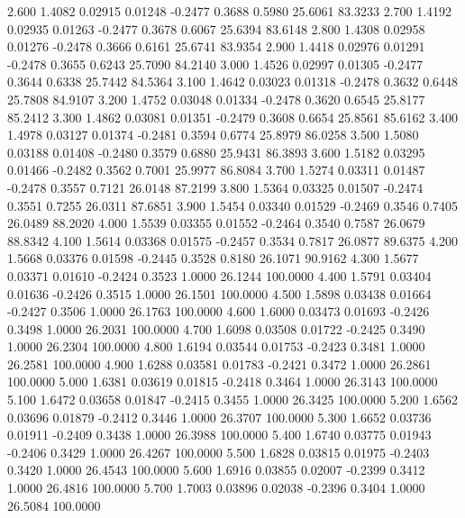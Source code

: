    2.600   1.4082   0.02915   0.01248  -0.2477   0.3688   0.5980  25.6061  83.3233
   2.700   1.4192   0.02935   0.01263  -0.2477   0.3678   0.6067  25.6394  83.6148
   2.800   1.4308   0.02958   0.01276  -0.2478   0.3666   0.6161  25.6741  83.9354
   2.900   1.4418   0.02976   0.01291  -0.2478   0.3655   0.6243  25.7090  84.2140
   3.000   1.4526   0.02997   0.01305  -0.2477   0.3644   0.6338  25.7442  84.5364
   3.100   1.4642   0.03023   0.01318  -0.2478   0.3632   0.6448  25.7808  84.9107
   3.200   1.4752   0.03048   0.01334  -0.2478   0.3620   0.6545  25.8177  85.2412
   3.300   1.4862   0.03081   0.01351  -0.2479   0.3608   0.6654  25.8561  85.6162
   3.400   1.4978   0.03127   0.01374  -0.2481   0.3594   0.6774  25.8979  86.0258
   3.500   1.5080   0.03188   0.01408  -0.2480   0.3579   0.6880  25.9431  86.3893
   3.600   1.5182   0.03295   0.01466  -0.2482   0.3562   0.7001  25.9977  86.8084
   3.700   1.5274   0.03311   0.01487  -0.2478   0.3557   0.7121  26.0148  87.2199
   3.800   1.5364   0.03325   0.01507  -0.2474   0.3551   0.7255  26.0311  87.6851
   3.900   1.5454   0.03340   0.01529  -0.2469   0.3546   0.7405  26.0489  88.2020
   4.000   1.5539   0.03355   0.01552  -0.2464   0.3540   0.7587  26.0679  88.8342
   4.100   1.5614   0.03368   0.01575  -0.2457   0.3534   0.7817  26.0877  89.6375
   4.200   1.5668   0.03376   0.01598  -0.2445   0.3528   0.8180  26.1071  90.9162
   4.300   1.5677   0.03371   0.01610  -0.2424   0.3523   1.0000  26.1244 100.0000
   4.400   1.5791   0.03404   0.01636  -0.2426   0.3515   1.0000  26.1501 100.0000
   4.500   1.5898   0.03438   0.01664  -0.2427   0.3506   1.0000  26.1763 100.0000
   4.600   1.6000   0.03473   0.01693  -0.2426   0.3498   1.0000  26.2031 100.0000
   4.700   1.6098   0.03508   0.01722  -0.2425   0.3490   1.0000  26.2304 100.0000
   4.800   1.6194   0.03544   0.01753  -0.2423   0.3481   1.0000  26.2581 100.0000
   4.900   1.6288   0.03581   0.01783  -0.2421   0.3472   1.0000  26.2861 100.0000
   5.000   1.6381   0.03619   0.01815  -0.2418   0.3464   1.0000  26.3143 100.0000
   5.100   1.6472   0.03658   0.01847  -0.2415   0.3455   1.0000  26.3425 100.0000
   5.200   1.6562   0.03696   0.01879  -0.2412   0.3446   1.0000  26.3707 100.0000
   5.300   1.6652   0.03736   0.01911  -0.2409   0.3438   1.0000  26.3988 100.0000
   5.400   1.6740   0.03775   0.01943  -0.2406   0.3429   1.0000  26.4267 100.0000
   5.500   1.6828   0.03815   0.01975  -0.2403   0.3420   1.0000  26.4543 100.0000
   5.600   1.6916   0.03855   0.02007  -0.2399   0.3412   1.0000  26.4816 100.0000
   5.700   1.7003   0.03896   0.02038  -0.2396   0.3404   1.0000  26.5084 100.0000
